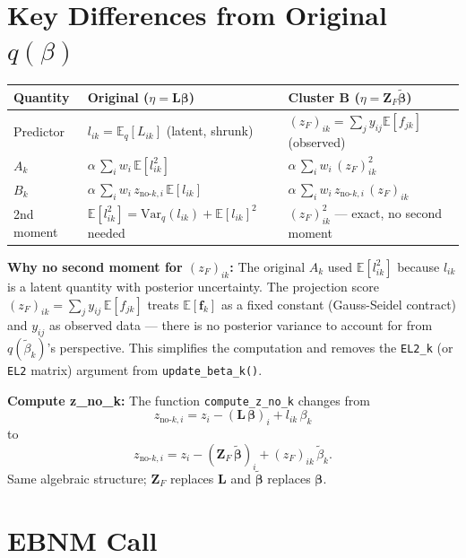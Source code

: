 \documentclass[11pt]{article}
\newcommand{\E}{\mathbb{E}}
\newcommand{\Var}{\mathrm{Var}}
\begin{document}
\section{Key Differences from Original $q(\beta)$}

\begin{center}
\renewcommand{\arraystretch}{1.4}
\begin{tabular}{lll}
\hline
\textbf{Quantity} & \textbf{Original ($\eta = \mathbf{L}\boldsymbol{\beta}$)} & \textbf{Cluster B ($\eta = \mathbf{Z}_F\tilde{\boldsymbol{\beta}}$)} \\
\hline
Predictor & $l_{ik} = \E_q[L_{ik}]$ (latent, shrunk) & $(z_F)_{ik} = \sum_j y_{ij}\E[f_{jk}]$ (observed) \\
$A_k$ & $\alpha\,\sum_i w_i\,\E[l_{ik}^2]$ & $\alpha\,\sum_i w_i\,(z_F)_{ik}^2$ \\
$B_k$ & $\alpha\,\sum_i w_i\,z_{\text{no-}k,i}\,\E[l_{ik}]$ & $\alpha\,\sum_i w_i\,z_{\text{no-}k,i}\,(z_F)_{ik}$ \\
2nd moment & $\E[l_{ik}^2] = \Var_q(l_{ik}) + \E[l_{ik}]^2$ needed & $(z_F)_{ik}^2$ — exact, no second moment \\
\hline
\end{tabular}
\end{center}

\bigskip
\textbf{Why no second moment for $(z_F)_{ik}$:} The original $A_k$ used $\E[l_{ik}^2]$
because $l_{ik}$ is a latent quantity with posterior uncertainty. The projection score
$(z_F)_{ik} = \sum_j y_{ij}\,\E[f_{jk}]$ treats $\E[\mathbf{f}_k]$ as a fixed constant
(Gauss-Seidel contract) and $y_{ij}$ as observed data — there is no posterior variance
to account for from $q(\tilde\beta_k)$'s perspective. This simplifies the computation
and removes the \texttt{EL2\_k} (or \texttt{EL2} matrix) argument from \texttt{update\_beta\_k()}.

\bigskip
\textbf{Compute z\_no\_k:} The function \texttt{compute\_z\_no\_k} changes from
\[
  z_{\text{no-}k,i} = z_i - (\mathbf{L}\,\boldsymbol\beta)_i + l_{ik}\,\beta_k
\]
to
\[
  z_{\text{no-}k,i} = z_i - (\mathbf{Z}_F\,\tilde{\boldsymbol\beta})_i + (z_F)_{ik}\,\tilde\beta_k.
\]
Same algebraic structure; $\mathbf{Z}_F$ replaces $\mathbf{L}$ and $\tilde{\boldsymbol\beta}$
replaces $\boldsymbol\beta$.

\section{EBNM Call}
\end{document}
